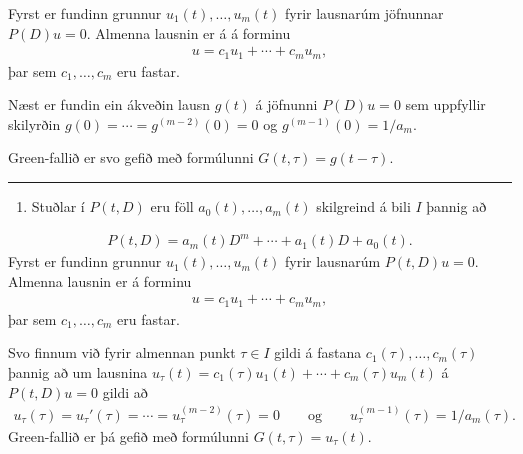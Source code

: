 \documentclass[a4paper,10pt,icelandic]{sphinxmanual}
\begin{document}
Fyrst er fundinn grunnur \(u_1(t), \ldots, u_m(t)\) fyrir lausnarúm jöfnunnar \(P(D)u=0\). Almenna lausnin er á á forminu
\begin{equation*}
\begin{split}u=c_1u_1+\cdots+c_mu_m,\end{split}
\end{equation*}
þar sem \(c_1, \ldots, c_m\) eru fastar.

Næst er fundin ein ákveðin lausn \(g(t)\) á jöfnunni \(P(D)u=0\) sem uppfyllir skilyrðin \(g(0)=\cdots=g^{(m-2)}(0)=0\) og \(g^{(m-1)}(0)=1/a_m\).

Green-fallið er svo gefið með formúlunni \(G(t,\tau)=g(t-\tau)\).


\bigskip\hrule\bigskip

\begin{enumerate}
%
\setcounter{enumi}{1}
\item {} 
Stuðlar í \(P(t,D)\) eru föll \(a_0(t), \ldots, a_m(t)\) skilgreind á bili \(I\) þannig að

\end{enumerate}
\begin{equation*}
\begin{split}P(t,D)=a_m(t)D^m+\cdots+a_1(t)D+a_0(t).\end{split}
\end{equation*}
Fyrst er fundinn grunnur \(u_1(t), \ldots, u_m(t)\) fyrir lausnarúm \(P(t,D)u=0\). Almenna lausnin er á forminu
\begin{equation*}
\begin{split}u=c_1u_1+\cdots+c_mu_m,\end{split}
\end{equation*}
þar sem \(c_1, \ldots, c_m\) eru fastar.

Svo finnum við fyrir almennan punkt \(\tau\in I\) gildi á fastana \(c_1(\tau), \ldots, c_m(\tau)\) þannig að um lausnina \(u_\tau(t)= c_1(\tau)u_1(t)+\cdots+c_m(\tau)u_m(t)\) á \(P(t,D)u=0\) gildi að
\begin{equation*}
\begin{split}u_\tau(\tau)=u_\tau'(\tau)=\cdots=u_\tau^{(m-2)}(\tau)=0\qquad\mbox{og}\qquad
u_\tau^{(m-1)}(\tau)=1/a_m(\tau).\end{split}
\end{equation*}
Green-fallið er þá gefið með formúlunni \(G(t,\tau)=u_\tau(t)\).
\end{document}

